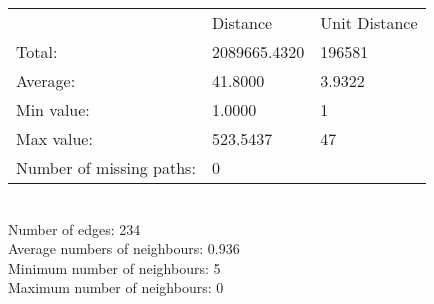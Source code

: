 \begin{tabular}{lll}
 & Distance & Unit Distance\\
Total: & 2089665.4320 & 196581\\
Average: & 41.8000 & 3.9322\\
Min value: & 1.0000 & 1\\
Max value: & 523.5437 & 47\\
\hline
Number of missing paths: & 0 &\\
\end{tabular}\\
Number of edges: 234\\
Average numbers of neighbours: 0.936\\
Minimum number of neighbours: 5\\
Maximum number of neighbours: 0\\
